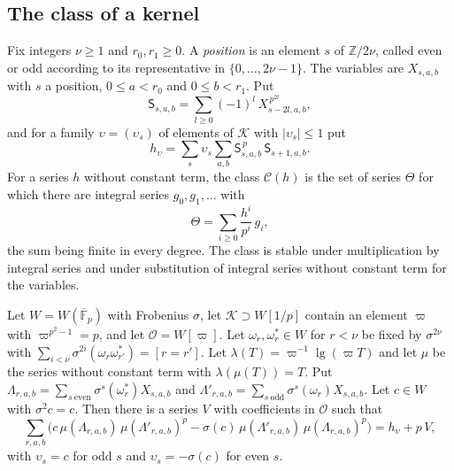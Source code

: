 \subsection{The class of a kernel}\label{sec:class}

Fix integers $\nu\ge1$ and $r_0,r_1\ge0$. A \emph{position} is an element $s$ of $\mathbb Z/2\nu$, called even or odd according to its representative in $\{0,\dots,2\nu-1\}$. The variables are $X_{s,a,b}$ with $s$ a position, $0\le a<r_0$ and $0\le b<r_1$. Put
\[
\mathsf S_{s,a,b}=\sum_{l\ge0}(-1)^l\,X_{s-2l,a,b}^{\,p^{2l}},
\]
and for a family $\upsilon=(\upsilon_s)$ of elements of $\mathcal K$ with $\lvert\upsilon_s\rvert\le1$ put
\begin{equation}\label{hups}
h_\upsilon=\sum_s\upsilon_s\sum_{a,b}\mathsf S_{s,a,b}^{\,p}\,\mathsf S_{s+1,a,b}.
\end{equation}
For a series $h$ without constant term, the class $\mathcal C(h)$ is the set of series $\Theta$ for which there are integral series $g_0,g_1,\dots$ with
\begin{equation}\label{classdef}
\Theta=\sum_{i\ge0}\frac{h^i}{p^i}\,g_i ,
\end{equation}
the sum being finite in every degree. The class is stable under multiplication by integral series and under substitution of integral series without constant term for the variables.

\begin{theorem}\label{thm:twosums}
Let $W=W(\overline{\mathbb F}_p)$ with Frobenius $\sigma$, let $\mathcal K\supset W[1/p]$ contain an element $\varpi$ with $\varpi^{p^2-1}=p$, and let $\mathcal O=W[\varpi]$. Let $\omega_r,\omega^\ast_r\in W$ for $r<\nu$ be fixed by $\sigma^{2\nu}$ with $\sum_{i<\nu}\sigma^{2i}(\omega_r\omega^\ast_{r'})=[r=r']$. Let $\lambda(T)=\varpi^{-1}\operatorname{lg}(\varpi T)$ and let $\mu$ be the series without constant term with $\lambda(\mu(T))=T$. Put $\Lambda_{r,a,b}=\sum_{s\ \mathrm{even}}\sigma^s(\omega^\ast_r)X_{s,a,b}$ and $\Lambda'_{r,a,b}=\sum_{s\ \mathrm{odd}}\sigma^s(\omega_r)X_{s,a,b}$. Let $c\in W$ with $\sigma^2c=c$. Then there is a series $V$ with coefficients in $\mathcal O$ such that
\[
\sum_{r,a,b}\Big(c\,\mu(\Lambda_{r,a,b})\,\mu(\Lambda'_{r,a,b})^p-\sigma(c)\,\mu(\Lambda'_{r,a,b})\,\mu(\Lambda_{r,a,b})^p\Big)=h_\upsilon+p\,V,
\]
with $\upsilon_s=c$ for odd $s$ and $\upsilon_s=-\sigma(c)$ for even $s$.
\end{theorem}

